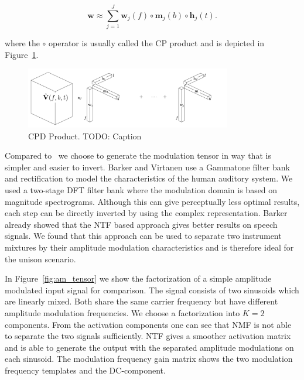 \begin{equation}
   \mathbf{w} \approx \sum\limits_{j=1}^{J} \mathbf{w}_{j}(f) \circ \mathbf{m}_{j}(b) \circ \mathbf{h}_{j}(t).
\end{equation}

where the \(\circ\) operator is usually called the CP product and is depicted in Figure~\ref{fig:cpd}.

\begin{figure}
  \centering
  \includegraphics[width=0.8\textwidth]{Chapters/06_Separation_Unknown/figures/cpd.pdf}
  \caption{CPD Product. TODO: Caption}
  \label{fig:cpd}
\end{figure}
\par
Compared to~\cite{barker13} we choose to generate the modulation tensor in way that is simpler and easier to invert. Barker and Virtanen use a Gammatone filter bank and  rectification to model the characteristics of the human auditory system. We used a two-stage DFT filter bank where the modulation domain is based on  magnitude spectrograms. Although this can give perceptually less optimal results, each step can be directly inverted by using the complex representation. Barker already showed that the NTF based approach gives better results on speech signals. We found that this approach can be used to separate two instrument mixtures by their amplitude modulation characteristics and is therefore ideal for the unison scenario.

In Figure~\ref{fig:am_tensor} we show the factorization of a simple amplitude modulated input signal for comparison. The signal consists of two sinusoids which are linearly mixed. Both share the same carrier frequency but have different amplitude modulation frequencies. We choose a factorization into $K=2$ components. From the activation components one can see that NMF is not able to separate the two signals sufficiently. NTF gives a smoother activation matrix and is able to generate the output with the separated amplitude modulations on each sinusoid. The modulation frequency gain matrix shows the two modulation frequency templates and the DC-component.

